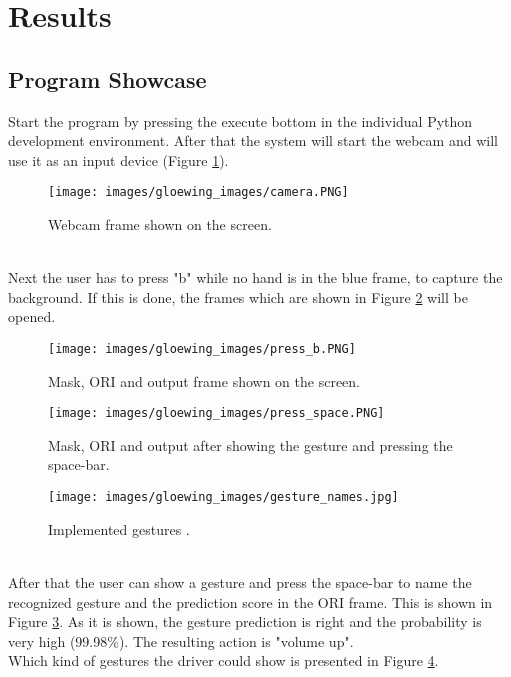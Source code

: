 \section{Results}
\label{sec:results}

\subsection{Program Showcase}
\label{subsec:program_showcase}

Start the program by pressing the execute bottom in the individual Python development environment. After that the system will start the webcam and will use it as an input device (Figure \ref{fig:camera}).
\begin{figure}
\sidecaption
\texttt{[image: images/gloewing\_images/camera.PNG]}
\caption{Webcam frame shown on the screen.}
\label{fig:camera}
\end{figure}\\
Next the user has to press "b" while no hand is in the blue frame, to capture the background. If this is done, the frames which are shown in Figure \ref{fig:press_b} will be opened.
\begin{figure}
\sidecaption
\texttt{[image: images/gloewing\_images/press\_b.PNG]}
\caption{Mask, ORI and output frame shown on the screen.}
\label{fig:press_b}
\end{figure}
\begin{figure}
\sidecaption
\texttt{[image: images/gloewing\_images/press\_space.PNG]}
\caption{Mask, ORI and output after showing the gesture and pressing the space-bar.}
\label{fig:press_space}
\end{figure}
\begin{figure}
\sidecaption
\texttt{[image: images/gloewing\_images/gesture\_names.jpg]}
\caption{Implemented gestures \cite{Brenner2018}.}
\label{fig:gesture_names}
\end{figure}\\
After that the user can show a gesture and press the space-bar to name the recognized gesture and the prediction score in the ORI frame. This is shown in Figure \ref{fig:press_space}. As it is shown, the gesture prediction is right and the probability is very high (99.98\%). The resulting action is "volume up".\\
Which kind of gestures the driver could show is presented in Figure \ref{fig:gesture_names}.\\
\\
\\
